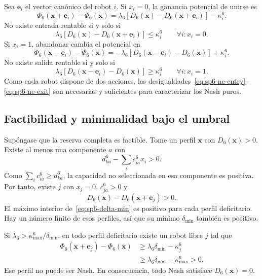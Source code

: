 Sea $\boldsymbol e_i$ el vector canónico del robot $i$. Si $x_i=0$, la ganancia potencial de unirse es
\[
 \Phi_6(\boldsymbol x+\boldsymbol e_i)-\Phi_6(\boldsymbol x)
 =\lambda_6\left[D_6(\boldsymbol x)-D_6(\boldsymbol x+\boldsymbol e_i)\right]-\kappa_i^6.
\]
No existe entrada rentable si y solo si
\begin{equation}
\label{eq:sp6-ne-entry}
 \lambda_6\left[D_6(\boldsymbol x)-D_6(\boldsymbol x+\boldsymbol e_i)\right]\leq\kappa_i^6
 \qquad\forall i:x_i=0.
\end{equation}
Si $x_i=1$, abandonar cambia el potencial en
\[
 \Phi_6(\boldsymbol x-\boldsymbol e_i)-\Phi_6(\boldsymbol x)
 =-\lambda_6\left[D_6(\boldsymbol x-\boldsymbol e_i)-D_6(\boldsymbol x)\right]+\kappa_i^6.
\]
No existe salida rentable si y solo si
\begin{equation}
\label{eq:sp6-ne-exit}
 \lambda_6\left[D_6(\boldsymbol x-\boldsymbol e_i)-D_6(\boldsymbol x)\right]\geq\kappa_i^6
 \qquad\forall i:x_i=1.
\end{equation}
Como cada robot dispone de dos acciones, las desigualdades~\eqref{eq:sp6-ne-entry}--\eqref{eq:sp6-ne-exit} son necesarias y suficientes para caracterizar los Nash puros.

\subsection{Factibilidad y minimalidad bajo el umbral}
\label{app:sp6-feasible-nash-proof}

Supóngase que la reserva completa es factible. Tome un perfil $\boldsymbol x$ con $D_6(\boldsymbol x)>0$. Existe al menos una componente $a$ con
\[
 d_{ka}^6-\sum_i c_{ia}^6x_i>0.
\]
Como $\sum_i c_{ia}^6\geq d_{ka}^6$, la capacidad no seleccionada en esa componente es positiva. Por tanto, existe $j$ con $x_j=0$, $c_{ja}^6>0$ y
\[
 D_6(\boldsymbol x)-D_6(\boldsymbol x+\boldsymbol e_j)>0.
\]
El máximo interior de~\eqref{eq:sp6-delta-min} es positivo para cada perfil deficitario. Hay un número finito de esos perfiles, así que su mínimo $\delta_{\min}$ también es positivo.

Si $\lambda_6>\kappa_{\max}^6/\delta_{\min}$, en todo perfil deficitario existe un robot libre $j$ tal que
\begin{align*}
 \Phi_6(\boldsymbol x+\boldsymbol e_j)-\Phi_6(\boldsymbol x)
 &\geq\lambda_6\delta_{\min}-\kappa_j^6\\
 &\geq\lambda_6\delta_{\min}-\kappa_{\max}^6>0.
\end{align*}
Ese perfil no puede ser Nash. En consecuencia, todo Nash satisface $D_6(\boldsymbol x)=0$.

